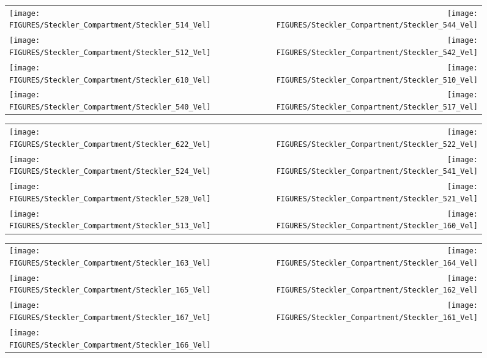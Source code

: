 \begin{figure}[p]
\begin{tabular*}{\textwidth}{l@{\extracolsep{\fill}}r}
\texttt{[image: FIGURES/Steckler\_Compartment/Steckler\_514\_Vel]} &
\texttt{[image: FIGURES/Steckler\_Compartment/Steckler\_544\_Vel]} \\
\texttt{[image: FIGURES/Steckler\_Compartment/Steckler\_512\_Vel]} &
\texttt{[image: FIGURES/Steckler\_Compartment/Steckler\_542\_Vel]} \\
\texttt{[image: FIGURES/Steckler\_Compartment/Steckler\_610\_Vel]} &
\texttt{[image: FIGURES/Steckler\_Compartment/Steckler\_510\_Vel]} \\
\texttt{[image: FIGURES/Steckler\_Compartment/Steckler\_540\_Vel]} &
\texttt{[image: FIGURES/Steckler\_Compartment/Steckler\_517\_Vel]}
\end{tabular*}
\label{Steckler_Vel_5}
\end{figure}

\begin{figure}[p]
\begin{tabular*}{\textwidth}{l@{\extracolsep{\fill}}r}
\texttt{[image: FIGURES/Steckler\_Compartment/Steckler\_622\_Vel]} &
\texttt{[image: FIGURES/Steckler\_Compartment/Steckler\_522\_Vel]} \\
\texttt{[image: FIGURES/Steckler\_Compartment/Steckler\_524\_Vel]} &
\texttt{[image: FIGURES/Steckler\_Compartment/Steckler\_541\_Vel]} \\
\texttt{[image: FIGURES/Steckler\_Compartment/Steckler\_520\_Vel]} &
\texttt{[image: FIGURES/Steckler\_Compartment/Steckler\_521\_Vel]} \\
\texttt{[image: FIGURES/Steckler\_Compartment/Steckler\_513\_Vel]} &
\texttt{[image: FIGURES/Steckler\_Compartment/Steckler\_160\_Vel]}
\end{tabular*}
\label{Steckler_Vel_6}
\end{figure}

\begin{figure}[p]
\begin{tabular*}{\textwidth}{l@{\extracolsep{\fill}}r}
\texttt{[image: FIGURES/Steckler\_Compartment/Steckler\_163\_Vel]} &
\texttt{[image: FIGURES/Steckler\_Compartment/Steckler\_164\_Vel]} \\
\texttt{[image: FIGURES/Steckler\_Compartment/Steckler\_165\_Vel]} &
\texttt{[image: FIGURES/Steckler\_Compartment/Steckler\_162\_Vel]} \\
\texttt{[image: FIGURES/Steckler\_Compartment/Steckler\_167\_Vel]} &
\texttt{[image: FIGURES/Steckler\_Compartment/Steckler\_161\_Vel]} \\
\texttt{[image: FIGURES/Steckler\_Compartment/Steckler\_166\_Vel]} &

\end{tabular*}
\label{Steckler_Vel_7}
\end{figure}




